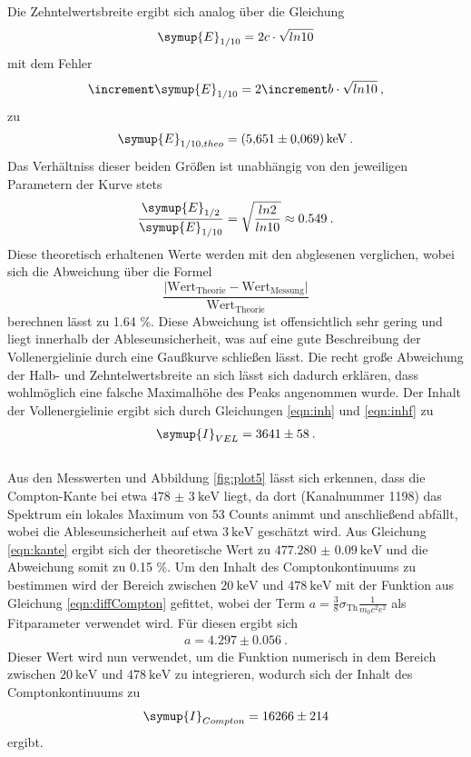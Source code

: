 Die Zehntelwertsbreite ergibt sich analog über die Gleichung
\begin{equation}
  \symup{E}_{1/10} = 2c\cdot\sqrt{ln10}
\end{equation}
mit dem Fehler
\begin{equation}
  \increment \symup{E}_{1/10} = 2\increment b\cdot\sqrt{ln10} \: ,
\end{equation}
zu
\begin{align*}
  \symup{E}_{1/10, theo} = \SI{5.651(69)}{\kilo\electronvolt} \: .
\end{align*}
Das Verhältniss dieser beiden Größen ist unabhängig von den jeweiligen Parametern der
Kurve stets
\begin{equation}
  \frac{\symup{E}_{1/2}}{\symup{E}_{1/10}} = \sqrt{\frac{ln2}{ln10}}
  \approx 0.549 \: .
\end{equation}
Diese theoretisch erhaltenen Werte werden mit den abglesenen verglichen, wobei sich
die Abweichung über die Formel
\begin{equation}
  \frac{\lvert \text{Wert}_{\text{Theorie}}-\text{Wert}_{\text{Messung}}\rvert}{\text{Wert}_{\text{Theorie}}}
  \label{eqn:abw}
\end{equation}
berechnen lässt zu 1.64 \%. Diese Abweichung ist offensichtlich sehr gering und liegt innerhalb der
Ableseunsicherheit, was auf eine gute Beschreibung der Vollenergielinie
durch eine Gaußkurve schließen lässt. Die recht große Abweichung der Halb- und Zehntelwertsbreite
an sich lässt sich dadurch erklären, dass wohlmöglich eine falsche Maximalhöhe des Peaks angenommen
wurde.
Der Inhalt der Vollenergielinie ergibt sich durch Gleichungen \ref{eqn:inh}
und \ref{eqn:inhf} zu
\begin{align*}
  \symup{I}_{VEL} =  3641 \pm 58 \: .
\end{align*}
\\
Aus den Messwerten und Abbildung \ref{fig:plot5} lässt sich erkennen, dass die
Compton-Kante bei etwa $\SI{478(3)}{\kilo\electronvolt}$ liegt, da dort (Kanalnummer
1198) das Spektrum ein lokales
Maximum von 53 Counts animmt und anschließend abfällt, wobei die Ableseunsicherheit auf etwa
$\SI{3}{\kilo\electronvolt}$ geschätzt wird.
Aus Gleichung \ref{eqn:kante} ergibt sich der theoretische Wert zu $\SI{477.280(90)}{\kilo\electronvolt}$
und die Abweichung somit zu 0.15 \%.
Um den Inhalt des Comptonkontinuums zu bestimmen wird der Bereich zwischen $\SI{20}{\kilo\electronvolt}$
und $\SI{478}{\kilo\electronvolt}$ mit der Funktion aus Gleichung \ref{eqn:diffCompton} gefittet,
wobei der Term $a =\frac{3}{8}\sigma_{\text{Th}}\frac{1}{m_0 c^2 e^2}$ als Fitparameter
verwendet wird. Für diesen ergibt sich
\begin{align*}
  a =  4.297 \pm 0.056 \: .
\end{align*}
Dieser Wert wird nun verwendet, um die Funktion numerisch in dem Bereich zwischen $\SI{20}{\kilo\electronvolt}$
und $\SI{478}{\kilo\electronvolt}$
zu integrieren, wodurch sich der Inhalt des Comptonkontinuums zu
\begin{align*}
  \symup{I}_{Compton} =  16266 \pm 214
\end{align*}
ergibt.


